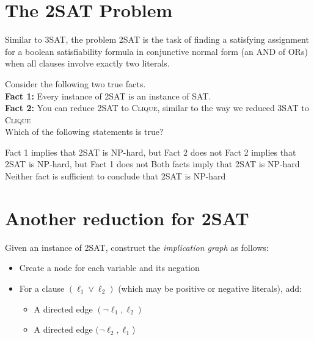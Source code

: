 \documentclass[11  pt]{article}
\begin{document}
\newpage

\section{The 2SAT Problem}
Similar to 3SAT, the problem 2SAT is the task of finding a satisfying assignment for a boolean satisfiability formula in conjunctive normal form (an AND of ORs) when all clauses involve exactly two literals. \\


\vspace{3cm}


\begin{Qu}
	Consider the following two true facts. \\
	
	\textbf{Fact 1:} Every instance of 2SAT is an instance of SAT. \\
	
	\textbf{Fact 2:} You can reduce 2SAT to \textsc{Clique}, similar to the way we reduced 3SAT to \textsc{Clique}\\
	
	Which of the following statements is true?
	\begin{itemize}
		\aitem Fact 1 implies that 2SAT is NP-hard, but Fact 2 does not
		\bitem Fact 2 implies that 2SAT is NP-hard, but Fact 1 does not
		\citem Both facts imply that 2SAT is NP-hard
		\ditem Neither fact is sufficient to conclude that 2SAT is NP-hard
	\end{itemize}	
\end{Qu}


\newpage
\section{Another reduction for 2SAT}

Given an instance of 2SAT, construct the \emph{implication graph} as follows:
\begin{itemize}
	\item Create a node for each variable and its negation
	\item For a clause $(\ell_1 \lor \ell_2)$ (which may be positive or negative literals), add:
	\begin{itemize}
		\item A directed edge $(\neg \ell_1, \ell_2)$
		\item A directed edge $(\neg \ell_2, \ell_1$)
	\end{itemize}
\end{itemize}
\end{document}
